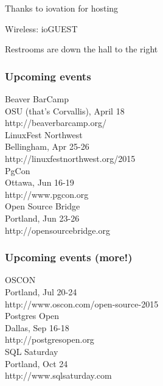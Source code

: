 \documentclass{beamer}
\begin{document}

\frame
{
  \begin{center}
  \item[]Thanks to iovation for hosting
  \item[]Wireless: ioGUEST
  \item[]Restrooms are down the hall to the right
  \end{center}
}

\frame
{
  \frametitle{Upcoming events}
  \begin{center}
{\large Beaver BarCamp\\}
OSU (that's Corvallis), April 18\\
http://beaverbarcamp.org/\\
\vspace{5 mm}
{\large LinuxFest Northwest\\}
Bellingham, Apr 25-26\\
http://linuxfestnorthwest.org/2015\\
\vspace{5 mm}
{\large PgCon\\}
Ottawa, Jun 16-19\\
http://www.pgcon.org\\
\vspace{5 mm}
{\large Open Source Bridge\\}
Portland, Jun 23-26\\
http://opensourcebridge.org\\
  \end{center}
}

\frame
{
  \frametitle{Upcoming events (more!)}
  \begin{center}
{\large OSCON\\}
Portland, Jul 20-24\\
http://www.oscon.com/open-source-2015\\
\vspace{5 mm}
{\large Postgres Open\\}
Dallas, Sep 16-18\\
http://postgresopen.org\\
\vspace{5 mm}
{\large SQL Saturday\\}
Portland, Oct 24\\
http://www.sqlsaturday.com\\
  \end{center}
}
\end{document}
